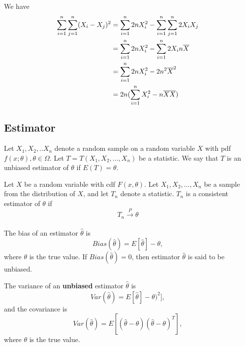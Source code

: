 \begin{refsection}
\begin{remark}
We have
\begin{align*}
\sum_{i=1}^n\sum_{j=1}^n (X_i - X_j)^2 &= \sum_{i=1}^n 2n X_i^2 - \sum_{i=1}^n\sum_{j=1}^n 2X_iX_j \\
&= \sum_{i=1}^n 2n X_i^2 - \sum_{i=1}^n 2X_in\overline{X} \\
&= \sum_{i=1}^n 2n X_i^2 - 2n^2\overline{X}^2 \\
&= 2n(\sum_{i=1}^n X_i^2 - n\overline{X}\overline{X})
\end{align*}

	
\end{remark}


\subsection{Estimator}
\begin{definition}
Let $X_1,X_2,..X_n$ denote a random sample on a random variable $X$ with pdf $f(x;\theta),\theta \in \Omega$. Let $T=T(X_1,X_2,...,X_n)$ be a statistic. We say that $T$ is an unbiased estimator of $\theta$ if $E(T)=\theta$.
\end{definition}


\begin{definition}
Let $X$ be a random variable with cdf $F(x,\theta)$. Let $X_1,X_2,...,X_n$ be a sample from the distribution of $X$, and let $T_n$ denote a statistic. $T_n$ is a consistent estimator of $\theta$ if
$$T_n \xrightarrow[ ]{P} \theta $$
\end{definition}



\begin{definition}
The bias of an estimator $\hat{\theta}$ is $$Bias(\hat{\theta}) = E[\hat{\theta}] - \theta,$$ 
where $\theta$ is the true value. If $Bias(\hat{\theta}) = 0$, then estimator $\hat{\theta}$ is said to be unbiased. 
\end{definition}


\begin{definition}
	The variance of an \textbf{unbiased} estimator $\hat{\theta}$ is $$Var(\hat{\theta}) = E[\hat{\theta}] - \theta)^2],$$
	and the covariance is
	$$Var(\hat{\theta}) = E[(\hat{\theta} - \theta)(\hat{\theta} - \theta)^T],$$
	where $\theta$ is the true value. 
\end{definition}


\end{refsection}
